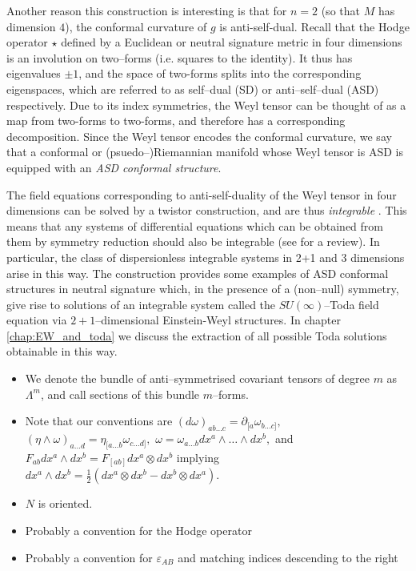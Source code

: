 Another reason this construction is interesting is that for $n=2$ (so that $M$ has dimension $4$), the conformal
curvature of $g$ is anti-self-dual. Recall that the Hodge operator
$\star$ defined by a Euclidean or neutral signature metric in four
dimensions is an involution on two--forms (i.e. squares to the identity).
It thus has eigenvalues $\pm1$, and the space of two-forms splits
into the corresponding eigenspaces, which are referred to as self--dual
(SD) or anti--self--dual (ASD) respectively. Due to its index symmetries,
the Weyl tensor can be thought of as a map from two-forms to two-forms,
and therefore has a corresponding decomposition. Since the Weyl tensor
encodes the conformal curvature, we say that a conformal or (psuedo--)Riemannian
manifold whose Weyl tensor is ASD is equipped with an \textit{ASD
conformal structure}.

The field equations corresponding to anti-self-duality of the Weyl
tensor in four dimensions can be solved by a twistor construction,
and are thus \textit{integrable} \cite{ward}. This means that any systems of differential
equations which can be obtained from them by symmetry reduction should
also be integrable (see \cite{MW} for a review). In particular, the class of dispersionless
integrable systems in 2+1 and 3 dimensions arise in this way. The
construction \cite{DM} provides some examples of
ASD conformal structures in neutral signature which, in the presence
of a (non--null) symmetry, give rise to solutions of an integrable
system called the $SU(\infty)$--Toda field equation via $2+1$--dimensional
Einstein-Weyl structures. In chapter \ref{chap:EW_and_toda} we discuss the extraction
of all possible Toda solutions obtainable in this way.

\begin{itemize}
\item We denote the bundle of anti--symmetrised covariant tensors of degree $m$ as $\Lambda^m$, and call sections of this bundle $m$--forms.
\item Note that our conventions are $(d\omega)_{ab\dots c}=\partial_{[a}\omega_{b\dots c]},$
$(\eta\wedge\omega)_{a\dots d}=\eta_{[a\dots b}\omega_{c\dots d]},$
$\omega=\omega_{a\dots b}dx^{a}\wedge\dots\wedge dx^{b},$
and $F_{ab}{d}x^{a}\wedge{d}x^{b}=F_{[ab]}{d}x^{a}\otimes{d}x^{b}$
implying ${d}x^{a}\wedge{d}x^{b}=\frac{1}{2}({d}x^{a}\otimes{d}x^{b}-{d}x^{b}\otimes{d}x^{a})$.
\item $N$ is oriented. 
\item Probably a convention for the Hodge operator
\item Probably a convention for $\varepsilon_{AB}$ and matching indices descending to the right
\end{itemize}

